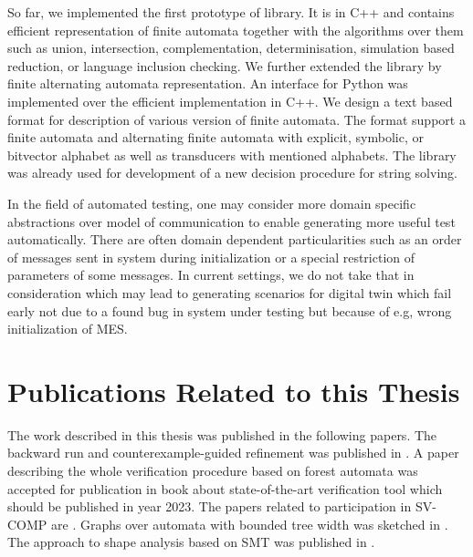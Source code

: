 {So far, we implemented the first prototype of library.
It is in C++ and contains efficient representation of finite automata
together with the algorithms over them such as union, intersection,
complementation, determinisation, simulation based reduction, or language inclusion checking.
We further extended the library by finite alternating automata representation.
An interface for Python was implemented over the efficient implementation in C++.
We design a text based format for description of various version of finite automata.
The format support a finite automata and alternating finite automata with explicit, symbolic,
or bitvector alphabet as well as transducers with mentioned alphabets.
The library was already used for development of a new decision procedure for string solving.


In the field of automated testing, one may consider more domain specific abstractions
over model of communication to enable generating more useful test automatically.
There are often domain dependent particularities such as an order of messages sent
in system during initialization or a special restriction of parameters of some
messages.
In current settings, we do not take that in consideration which may lead to
generating scenarios for digital twin which fail early not due to a found bug
in system under testing but because of e.g, wrong initialization of MES.\

\section{Publications Related to this Thesis}
The work described in this thesis was published in the following papers.
The backward run and counterexample-guided refinement was published in \cite{vmcai17}.
A paper describing the whole verification procedure based on forest automata
was accepted for publication in book about state-of-the-art verification tool which
should be published in year 2023.
The papers related to \forester participation in SV-COMP are \cite{svcomp15-forester,holik_run_2016,holik_forester_2017}.
Graphs over automata with bounded tree width was sketched in \cite{netys21}.
The approach to shape analysis based on SMT was published in \cite{fmcad18, svcomp-2ls}.

}
